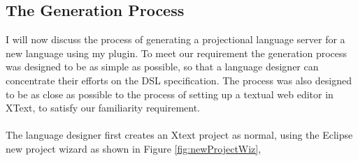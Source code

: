 \documentclass{article}
\begin{document}
\subsection{The Generation Process}
I will now discuss the process of generating a projectional language server for a new language using my plugin. To meet our \RSetup requirement the generation process was designed to be as simple as possible, so that a language designer can concentrate their efforts on the DSL specification. The process was also designed to be as close as possible to the process of setting up a textual web editor in XText, to satisfy our familiarity \RFamiliarity requirement.
\\
\\
The language designer first creates an Xtext project as normal, using the Eclipse new project wizard as shown in Figure \ref{fig:newProjectWiz},
\end{document}
